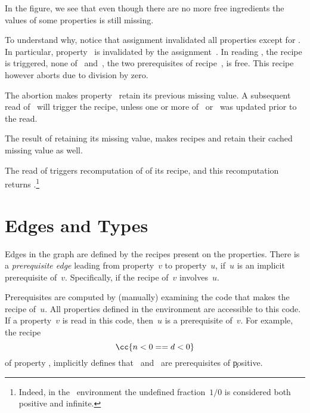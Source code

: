 \begin{enumerate}
\begin{enumerate}
          In the figure, we see that even though there are no more free
          ingredients the values of some properties is still missing. 

          To understand why, notice that assignment  invalidated all
          properties except for . In particular, property~ is 
          invalidated by the assignment~.  In reading ,
          the recipe is triggered, none of~ and~, the two
          prerequisites of recipe~, is free.
          This recipe however aborts due to division by zero.  

          The abortion makes property~ retain its previous missing value.
          A subsequent read of~ will trigger the recipe, unless one or
          more of~ or~ was updated prior to the read.  
          
          The result of  retaining its missing value, makes recipes
           and  retain their cached
          missing value as well.

         
          The read of  triggers recomputation of of its recipe,
          and this recomputation returns .\footnote{%
            Indeed, in the~ environment the undefined fraction~$1/0$ is
          considered both positive and infinite.}
          
         
                    
  \end{enumerate}
\end{enumerate}

\section{Edges and Types}

Edges in the graph are defined by the recipes present on the properties. There
is a \emph{prerequisite edge} leading from property~$v$ to property~$u$, if~$u$
is an implicit prerequisite of~$v$. Specifically, if the recipe of~$v$
involves~$u$.

Prerequisites are computed by (manually) examining the \Java code that makes
the recipe of~$u$. All properties defined in the environment are accessible to
this \Java code. If a property~$v$ is read in this code, then~$u$ is a
prerequisite of~$v$.
For example, the recipe \[
\cc{n < 0 == d < 0}
\] of property , implicitly defines that~ and~ are
prerequisites of \c{positive}.

